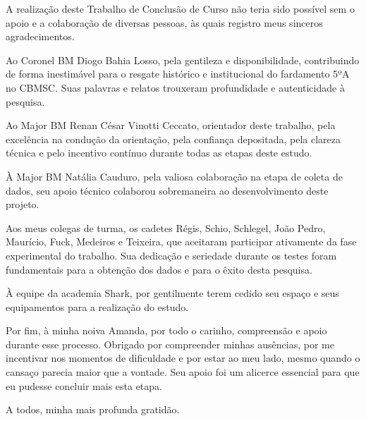 
A realização deste Trabalho de Conclusão de Curso não teria sido possível sem o apoio e a colaboração de diversas pessoas, às quais registro meus sinceros agradecimentos.

Ao Coronel BM Diogo Bahia Losso, pela gentileza e disponibilidade, contribuindo de forma inestimável para o resgate histórico e institucional do fardamento 5ºA no CBMSC. Suas palavras e relatos trouxeram profundidade e autenticidade à pesquisa.

Ao Major BM Renan César Vinotti Ceccato, orientador deste trabalho, pela excelência na condução da orientação, pela confiança depositada, pela clareza técnica e pelo incentivo contínuo durante todas as etapas deste estudo.

À Major BM Natália Cauduro, pela valiosa colaboração na etapa de coleta de dados, seu apoio técnico colaborou sobremaneira ao desenvolvimento deste projeto.

Aos meus colegas de turma, os cadetes Régis, Schio, Schlegel, João Pedro, Maurício, Fuck, Medeiros e Teixeira, que aceitaram participar ativamente da fase experimental do trabalho. Sua dedicação e seriedade durante os testes foram fundamentais para a obtenção dos dados e para o êxito desta pesquisa.

À equipe da academia Shark, por gentilmente terem cedido seu espaço e seus equipamentos para a realização do estudo.

Por fim, à minha noiva Amanda, por todo o carinho, compreensão e apoio durante esse processo. Obrigado por compreender minhas ausências, por me incentivar nos momentos de dificuldade e por estar ao meu lado, mesmo quando o cansaço parecia maior que a vontade. Seu apoio foi um alicerce essencial para que eu pudesse concluir mais esta etapa.

A todos, minha mais profunda gratidão.